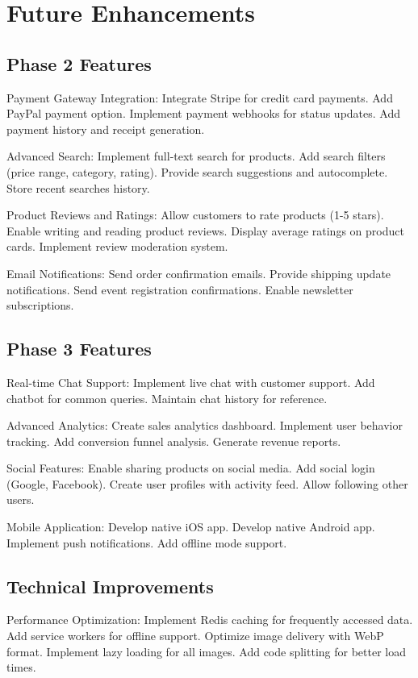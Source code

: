 ﻿\documentclass[11pt]{article}
\begin{document}
\section{Future Enhancements}

\subsection{Phase 2 Features}
Payment Gateway Integration: Integrate Stripe for credit card payments. Add PayPal payment option. Implement payment webhooks for status updates. Add payment history and receipt generation.

Advanced Search: Implement full-text search for products. Add search filters (price range, category, rating). Provide search suggestions and autocomplete. Store recent searches history.

Product Reviews and Ratings: Allow customers to rate products (1-5 stars). Enable writing and reading product reviews. Display average ratings on product cards. Implement review moderation system.

Email Notifications: Send order confirmation emails. Provide shipping update notifications. Send event registration confirmations. Enable newsletter subscriptions.

\subsection{Phase 3 Features}
Real-time Chat Support: Implement live chat with customer support. Add chatbot for common queries. Maintain chat history for reference.

Advanced Analytics: Create sales analytics dashboard. Implement user behavior tracking. Add conversion funnel analysis. Generate revenue reports.

Social Features: Enable sharing products on social media. Add social login (Google, Facebook). Create user profiles with activity feed. Allow following other users.

Mobile Application: Develop native iOS app. Develop native Android app. Implement push notifications. Add offline mode support.

\subsection{Technical Improvements}
Performance Optimization: Implement Redis caching for frequently accessed data. Add service workers for offline support. Optimize image delivery with WebP format. Implement lazy loading for all images. Add code splitting for better load times.
\end{document}
